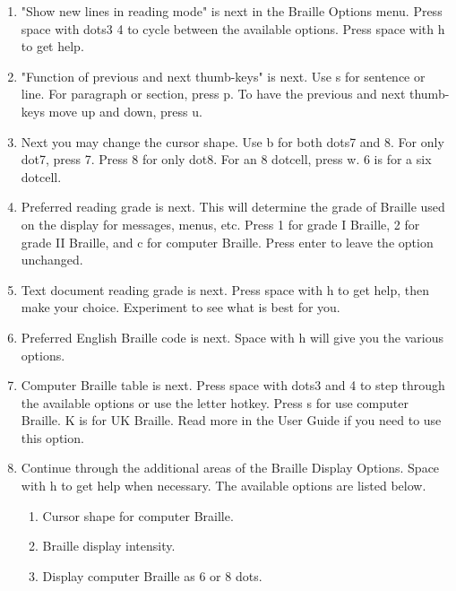 \documentclass[10pt,letterpaper,twoside]{report}
\begin{document}
{{{{\begin{enumerate}
	\item "Show new lines in reading mode" is next in the Braille Options menu. Press space with dots3 4 to cycle between the available options.  Press space with h to get help.
	      
	\item "Function of previous and next thumb-keys" is next.  Use s for sentence or line.  For paragraph or section, press p.  To have the previous and next thumb-keys move up and down, press u.
	      
	\item Next you may change the cursor shape.  Use b for both dots7 and 8.  For only dot7, press 7.  Press 8 for only dot8. For an 8 dotcell, press w.  6 is for a six dotcell.
	      
	\item Preferred reading grade is next.  This will determine the grade of Braille used on the display for messages, menus, etc.  Press 1 for grade I Braille, 2 for grade II Braille, and c for computer Braille.  Press enter to leave the option unchanged.
	      
	\item Text document reading grade is next.  Press space with h to get help, then make your choice.  Experiment to see what is best for you.
	      
	\item Preferred English Braille code is next.  Space with h will give you the various options.
	      
	\item Computer Braille table is next.  Press space with dots3 and 4 to step through the available options or use the letter hotkey.  Press s for use computer Braille.  K is for UK Braille.  Read more in the User Guide if you need to use this option.
	      
	\item Continue through the additional areas of the Braille Display Options. Space with h to get help when necessary.  The available options are listed below.
	      
	      \begin{enumerate}
		      \item Cursor shape for computer Braille.
		            
		      \item Braille display intensity.
		            
		      \item Display computer Braille as 6 or 8 dots.
		            

\end{enumerate}
\end{enumerate}}}}}
\end{document}
